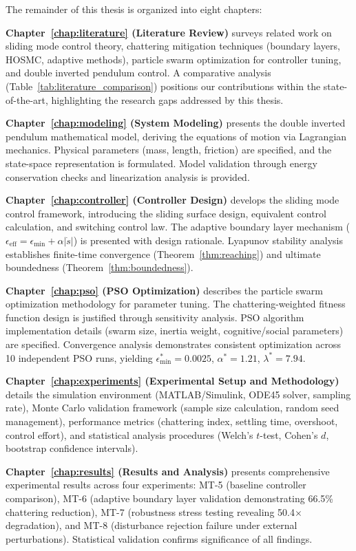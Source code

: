 The remainder of this thesis is organized into eight chapters:

\textbf{Chapter~\ref{chap:literature} (Literature Review)} surveys related work on sliding mode control theory, chattering mitigation techniques (boundary layers, HOSMC, adaptive methods), particle swarm optimization for controller tuning, and double inverted pendulum control. A comparative analysis (Table~\ref{tab:literature_comparison}) positions our contributions within the state-of-the-art, highlighting the research gaps addressed by this thesis.

\textbf{Chapter~\ref{chap:modeling} (System Modeling)} presents the double inverted pendulum mathematical model, deriving the equations of motion via Lagrangian mechanics. Physical parameters (mass, length, friction) are specified, and the state-space representation is formulated. Model validation through energy conservation checks and linearization analysis is provided.

\textbf{Chapter~\ref{chap:controller} (Controller Design)} develops the sliding mode control framework, introducing the sliding surface design, equivalent control calculation, and switching control law. The adaptive boundary layer mechanism ($\epsilon_{\text{eff}} = \epsilon_{\min} + \alpha|\dot{s}|$) is presented with design rationale. Lyapunov stability analysis establishes finite-time convergence (Theorem~\ref{thm:reaching}) and ultimate boundedness (Theorem~\ref{thm:boundedness}).

\textbf{Chapter~\ref{chap:pso} (PSO Optimization)} describes the particle swarm optimization methodology for parameter tuning. The chattering-weighted fitness function design is justified through sensitivity analysis. PSO algorithm implementation details (swarm size, inertia weight, cognitive/social parameters) are specified. Convergence analysis demonstrates consistent optimization across 10 independent PSO runs, yielding $\epsilon_{\min}^* = 0.0025$, $\alpha^* = 1.21$, $\lambda^* = 7.94$.

\textbf{Chapter~\ref{chap:experiments} (Experimental Setup and Methodology)} details the simulation environment (MATLAB/Simulink, ODE45 solver, sampling rate), Monte Carlo validation framework (sample size calculation, random seed management), performance metrics (chattering index, settling time, overshoot, control effort), and statistical analysis procedures (Welch's $t$-test, Cohen's $d$, bootstrap confidence intervals).

\textbf{Chapter~\ref{chap:results} (Results and Analysis)} presents comprehensive experimental results across four experiments: MT-5 (baseline controller comparison), MT-6 (adaptive boundary layer validation demonstrating 66.5\% chattering reduction), MT-7 (robustness stress testing revealing 50.4$\times$ degradation), and MT-8 (disturbance rejection failure under external perturbations). Statistical validation confirms significance of all findings.

